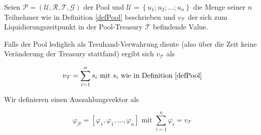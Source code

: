 \begin{Fazit}

Seien $\mathcal{P} = \left( \mathcal{U}, \mathcal{R}, \mathcal{T}, \mathcal{G} \right)$ 
der Pool und $\mathcal{U} = \left\{ u_1; u_2;...;u_n \right\}$ die Menge seiner $n$ Teilnehmer wie in Definition \ref{defPool} beschrieben und $v_{\mathcal{T}}$ der sich zum Liquidierungszeitpunkt in der Pool-Treasury $\mathcal{T}$ befindende Value. 

Falls der Pool lediglich als Treuhand-Verwahrung diente (also über die Zeit keine Veränderung der Treasury stattfand) ergibt sich $v_{\mathcal{T}}$ als  

\vspace{0.1cm}

\begin{equation*}
  v_{\mathcal{T}} = \sum_{i=1}^{n} s_i \text{ mit } s_i \text{ wie in Definition \ref{defPool}}
\end{equation*}

\vspace{0.2cm}

Wir definieren einen Auszahlungsvektor als

\begin{equation*}
  \varphi_{\mathcal{P}} = [\varphi_1, \varphi_1, ..., \varphi_n] \text{ mit } \sum_{i=1}^{n} \varphi_i = v_{\mathcal{T}} 
\end{equation*}

\vspace{0.2cm}


\vspace{0.2cm}


\vspace{0.2cm}


\end{Fazit}

\vspace{0.3cm}


\vspace{0.5cm}

